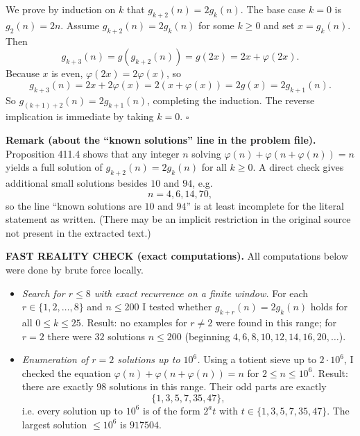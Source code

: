 We prove by induction on $k$ that $g_{k+2}(n)=2g_k(n)$.
The base case $k=0$ is $g_2(n)=2n$.
Assume $g_{k+2}(n)=2g_k(n)$ for some $k\ge0$ and set $x=g_k(n)$.
Then
\[
  g_{k+3}(n)=g(g_{k+2}(n))=g(2x)=2x+\varphi(2x).
\]
Because $x$ is even, $\varphi(2x)=2\varphi(x)$, so
\[
  g_{k+3}(n)=2x+2\varphi(x)=2(x+\varphi(x))=2g(x)=2g_{k+1}(n).
\]
So $g_{(k+1)+2}(n)=2g_{k+1}(n)$, completing the induction.
The reverse implication is immediate by taking $k=0$.
\hfill$\square$

\textbf{Remark (about the ``known solutions'' line in the problem file).}
Proposition 411.4 shows that any integer $n$ solving $\varphi(n)+\varphi(n+\varphi(n))=n$ yields a full solution of $g_{k+2}(n)=2g_k(n)$ for all $k\ge0$.
A direct check gives additional small solutions besides $10$ and $94$, e.g.
$$n=4,6,14,70,$$
so the line ``known solutions are $10$ and $94$'' is at least incomplete for the literal statement as written.
(There may be an implicit restriction in the original source not present in the extracted text.)

\textbf{FAST REALITY CHECK (exact computations).}
All computations below were done by brute force locally.

\begin{itemize}
\item \emph{Search for $r\le 8$ with exact recurrence on a finite window.}
For each $r\in\{1,2,\dots,8\}$ and $n\le 200$ I tested whether $g_{k+r}(n)=2g_k(n)$ holds for all $0\le k\le 25$.
Result: no examples for $r\ne 2$ were found in this range; for $r=2$ there were $32$ solutions $n\le 200$ (beginning $4,6,8,10,12,14,16,20,\dots$).

\item \emph{Enumeration of $r=2$ solutions up to $10^6$.}
Using a totient sieve up to $2\cdot 10^6$, I checked the equation $\varphi(n)+\varphi(n+\varphi(n))=n$ for $2\le n\le 10^6$.
Result: there are exactly $98$ solutions in this range.
Their odd parts are exactly
$$\{1,3,5,7,35,47\},$$
i.e. every solution up to $10^6$ is of the form $2^a t$ with $t\in\{1,3,5,7,35,47\}$.
The largest solution $\le 10^6$ is $917504$.
\end{itemize}

